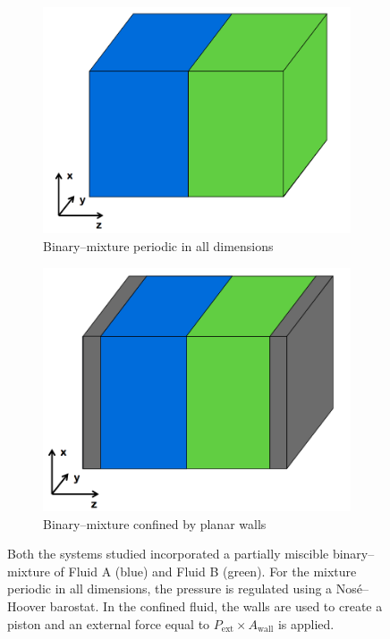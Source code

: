 \begin{figure}[h]
	\begin{subfigure}{.5\linewidth}
		\includegraphics[scale=0.25]{AABB.png}
		\caption{Binary--mixture periodic in all dimensions}
		\label{AABB}
	\end{subfigure}
	\begin{subfigure}{.5\linewidth}
		\includegraphics[scale=0.25]{AABB_piston.png}
		\caption{Binary--mixture confined by planar walls} 
		\label{AABB_piston}
	\end{subfigure}
	\caption{Both the systems studied incorporated a partially miscible binary--mixture of Fluid A (blue) and Fluid B (green).
For the mixture periodic in all dimensions, the pressure is regulated using a Nos\'{e}--Hoover barostat.
In the confined fluid, the walls are used to create a piston and an external force equal to $P_{\mathrm{ext}} \times A_{\mathrm{wall}}$ is applied.
}
	\label{SetUp}
\end{figure}

